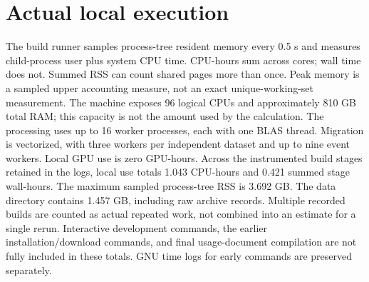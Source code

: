 \documentclass[11pt]{article}
\begin{document}
\section{Actual local execution}
The build runner samples process-tree resident memory every 0.5 s and measures
child-process user plus system CPU time. CPU-hours sum across cores; wall time
does not. Summed RSS can count shared pages more than once. Peak memory is a
sampled upper accounting measure, not an exact unique-working-set measurement.
The machine exposes 96 logical CPUs and approximately 810 GB total RAM; this
capacity is not the amount used by the calculation. The processing uses up to
16 worker processes, each with one BLAS thread. Migration is vectorized, with three workers per independent dataset
and up to nine event workers. Local GPU use is zero GPU-hours.
Across the instrumented build stages retained in the logs, local use totals 1.043 CPU-hours and 0.421 summed stage wall-hours. The maximum sampled process-tree RSS is 3.692 GB. The data directory contains 1.457 GB, including raw archive records. Multiple recorded builds are counted as actual repeated work, not combined into an estimate for a single rerun. Interactive development commands, the earlier installation/download commands, and final usage-document compilation are not fully included in these totals. GNU time logs for early commands are preserved separately.
\end{document}
